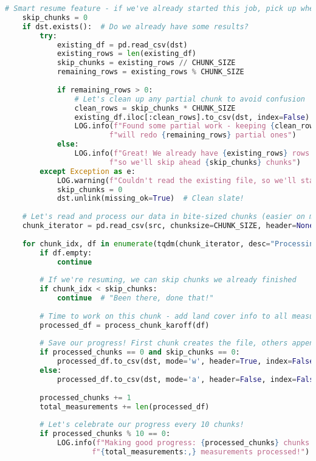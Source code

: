 \begin{lstlisting}[language=Python, caption=Land Cover Classification Addition Algorithm, label=alg:step02_add_lc, breaklines=true]
    # Smart resume feature - if we've already started this job, pick up where we left off
    skip_chunks = 0
    if dst.exists():  # Do we already have some results?
        try:
            existing_df = pd.read_csv(dst)
            existing_rows = len(existing_df)
            skip_chunks = existing_rows // CHUNK_SIZE
            remaining_rows = existing_rows % CHUNK_SIZE
            
            if remaining_rows > 0:
                # Let's clean up any partial chunk to avoid confusion
                clean_rows = skip_chunks * CHUNK_SIZE
                existing_df.iloc[:clean_rows].to_csv(dst, index=False)
                LOG.info(f"Found some partial work - keeping {clean_rows} good rows, "
                        f"will redo {remaining_rows} partial ones")
            else:
                LOG.info(f"Great! We already have {existing_rows} rows done, "
                        f"so we'll skip ahead {skip_chunks} chunks")
        except Exception as e:
            LOG.warning(f"Couldn't read the existing file, so we'll start fresh: {e}")
            skip_chunks = 0
            dst.unlink(missing_ok=True)  # Clean slate!
    
    # Let's read and process our data in bite-sized chunks (easier on memory!)
    chunk_iterator = pd.read_csv(src, chunksize=CHUNK_SIZE, header=None, names=headernames)
    
    for chunk_idx, df in enumerate(tqdm(chunk_iterator, desc="Processing chunks")):
        if df.empty:
            continue
            
        # If we're resuming, we can skip chunks we already finished
        if chunk_idx < skip_chunks:
            continue  # "Been there, done that!"
            
        # Time to work on this chunk - add land cover info to all measurements!
        processed_df = process_chunk_karoff(df)
        
        # Save our progress! First chunk creates the file, others append to it
        if processed_chunks == 0 and skip_chunks == 0:
            processed_df.to_csv(dst, mode='w', header=True, index=False)   # New file with headers
        else:
            processed_df.to_csv(dst, mode='a', header=False, index=False)  # Add to existing file
        
        processed_chunks += 1
        total_measurements += len(processed_df)
        
        # Let's celebrate our progress every 10 chunks!
        if processed_chunks % 10 == 0:
            LOG.info(f"Making good progress: {processed_chunks} chunks done, "
                    f"{total_measurements:,} measurements processed!")
    

\end{lstlisting}
